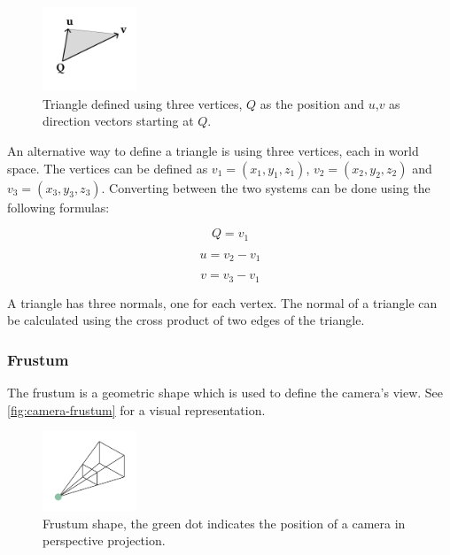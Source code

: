 \begin{figure}[H]
  \centering
  \includegraphics[width=0.25\textwidth]{resources/q-u-v-parameterization.png}
  \caption{Triangle defined using three vertices, $Q$ as the position and $u$,$v$ as direction vectors starting at $Q$.}
  \label{fig:q-u-v-parameterization}
\end{figure}

An alternative way to define a triangle is using three vertices, each in world space. The vertices can be defined as $v_1 = (x_1, y_1, z_1)$, $v_2 = (x_2, y_2, z_2)$ and $v_3 = (x_3, y_3, z_3)$. Converting between the two systems can be done using the following formulas:

\begin{equation}
  \label{eqn:triangle-vertices-to-q-u-v}
  Q = v_1
\end{equation}

\begin{equation}
  \label{eqn:triangle-vertices-to-q-u-v1}
  u = v_2 - v_1
\end{equation}

\begin{equation}
  \label{eqn:triangle-vertices-to-q-u-v2}
  v = v_3 - v_1
\end{equation}

A triangle has three normals, one for each vertex. The normal of a triangle can be calculated using the cross product of two edges of the triangle.

\subsubsection{Frustum}

The frustum is a geometric shape which is used to define the camera's view. See \autoref{fig:camera-frustum} for a visual representation.

\begin{figure}[H]
  \centering
  \includegraphics[width=0.25\textwidth]{resources/camera-frustum.png}
  \caption{Frustum shape, the green dot indicates the position of a camera in perspective projection.}
  \label{fig:camera-frustum}
\end{figure}

